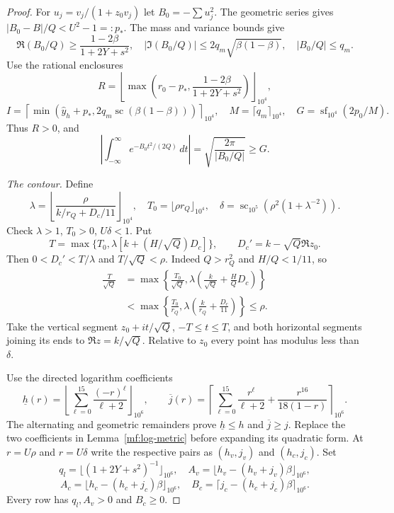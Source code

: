 \begin{proof}
For $u_j=v_j/(1+z_0v_j)$ let $B_0=-\sum u_j^2$.
The geometric series gives
$|B_0-B|/Q<U^2-1=:p_*$. The mass and variance bounds give
\[
 \Re(B_0/Q)\ge\frac{1-2\beta}{1+2Y+s^2},\quad
 |\Im(B_0/Q)|\le2q_m\sqrt{\beta(1-\beta)},\quad
 |B_0/Q|\le q_m.
\]
Use the rational enclosures
\[
 R=\left\lfloor\max\left(r_0-p_*,
             \frac{1-2\beta}{1+2Y+s^2}\right)\right\rfloor_{10^4},
\]
\[
 I=\left\lceil\min(\widehat y_h+p_*,
             2q_m\operatorname{sc}(\beta(1-\beta)))\right\rceil_{10^4},
 \quad M=\lceil q_m\rceil_{10^4},\quad
 G=\operatorname{sf}_{10^4}(2p_0/M).
\]
Thus $R>0$, and
\[
 \left|\int_{-\infty}^{\infty}e^{-B_0t^2/(2Q)}\,dt\right|
 =\sqrt{\frac{2\pi}{|B_0/Q|}}\ge G.
\]

\smallskip
\noindent\emph{The contour.}
Define
\[
 \lambda=\left\lfloor\frac{\rho}{k/r_Q+D_c/11}\right\rfloor_{10^4},
 \quad T_0=\lfloor\rho r_Q\rfloor_{10^4},\quad
 \delta=\operatorname{sc}_{10^5}(\rho^2(1+\lambda^{-2})).
\]
Check $\lambda>1$, $T_0>0$, $U\delta<1$. Put
\[
 T=\max\{T_0,\lambda[k+(H/\sqrt Q)D_c]\},\qquad
 D_c'=k-\sqrt Q\Re z_0.
\]
Then $0<D_c'<T/\lambda$ and $T/\sqrt Q<\rho$.
Indeed $Q>r_Q^2$ and $H/Q<1/11$, so
\begin{align*}
 \frac{T}{\sqrt Q}
 &=\max\left\{\frac{T_0}{\sqrt Q},
       \lambda\left(\frac{k}{\sqrt Q}+\frac{H}{Q}D_c\right)\right\}\\
 &<\max\left\{\frac{T_0}{r_Q},
       \lambda\left(\frac{k}{r_Q}+\frac{D_c}{11}\right)\right\}
 \le\rho.
\end{align*}
Take the vertical segment $z_0+it/\sqrt Q$, $-T\le t\le T$,
and both horizontal segments joining its ends to $\Re z=k/\sqrt Q$.
Relative to $z_0$ every point has modulus less than $\delta$.

Use the directed logarithm coefficients
\begin{equation}\label{mf:directed-log}
 \underline h(r)=\left\lfloor\sum_{\ell=0}^{15}
                      \frac{(-r)^\ell}{\ell+2}\right\rfloor_{10^6},
 \qquad
 \overline j(r)=\left\lceil\sum_{\ell=0}^{15}
          \frac{r^\ell}{\ell+2}+\frac{r^{16}}{18(1-r)}
                       \right\rceil_{10^6}.
\end{equation}
The alternating and geometric remainders prove
$\underline h\le h$ and $\overline j\ge j$.
Replace the two coefficients in Lemma~\ref{mf:log-metric}
before expanding its quadratic form. At $r=U\rho$ and
$r=U\delta$ write the respective pairs as $(h_v,j_v)$ and
$(h_c,j_c)$. Set
\[
 q_l=\lfloor(1+2Y+s^2)^{-1}\rfloor_{10^6},\quad
 A_v=\lfloor h_v-(h_v+j_v)\beta\rfloor_{10^6},
\]
\[
 A_c=\lfloor h_c-(h_c+j_c)\beta\rfloor_{10^6},\quad
 B_c=\lceil j_c-(h_c+j_c)\beta\rceil_{10^6}.
\]
Every row has $q_l,A_v>0$ and $B_c\ge0$.


\end{proof}
